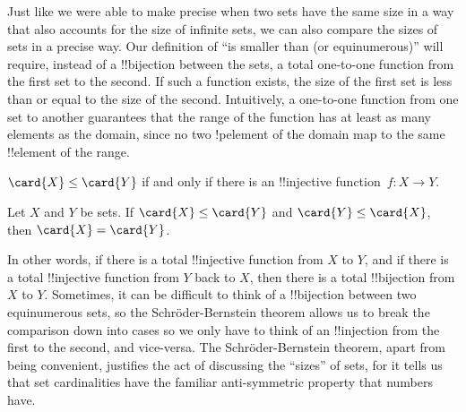 \documentclass[../../include/open-logic-section]{subfiles}
\begin{document}


\begin{explain}
Just like we were able to make precise when two sets have the same
size in a way that also accounts for the size of infinite sets, we can
also compare the sizes of sets in a precise way. Our definition of
``is smaller than (or equinumerous)'' will require, instead of a
!!{bijection} between the sets, a total one-to-one function from the first
set to the second. If such a function exists, the size of the first
set is less than or equal to the size of the second.  Intuitively, a
one-to-one function from one set to another guarantees that the range of
the function has at least as many elements as the domain, since no two
!p{element} of the domain map to the same !!{element} of the range.
\end{explain}

\begin{defn}
$\card{X} \leq \card{Y}$ if and only if there is an !!{injective}
  function~$f \colon X \to Y$.
\end{defn}

\begin{thm}
Let $X$ and $Y$ be sets. If $\card{X} \leq \card{Y}$ and $\card{Y}
\leq \card{X}$, then $\card{X} = \card{Y}$.
\end{thm}

\begin{explain}
In other words, if there is a total !!{injective} function from $X$ to
$Y$, and if there is a total !!{injective} function from $Y$ back to $X$,
then there is a total !!{bijection} from $X$ to $Y$. Sometimes, it can be
difficult to think of a !!{bijection} between two equinumerous sets, so
the Schr\"oder-Bernstein theorem allows us to break the comparison
down into cases so we only have to think of an !!{injection} from the
first to the second, and vice-versa. The Schr\"oder-Bernstein theorem,
apart from being convenient, justifies the act of discussing the
``sizes'' of sets, for it tells us that set cardinalities have the
familiar anti-symmetric property that numbers have.
\end{explain}
\end{document}
